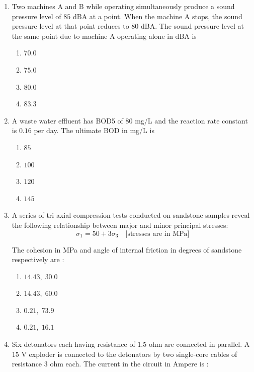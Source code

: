 \documentclass[journal,12pt,onecolumn]{IEEEtran}
\theoremstyle{remark}
\begin{document}
\begin{enumerate}
\hfill{}
\item Two machines A and B while operating simultaneously produce a sound pressure level of $85$ dBA at a point. When the machine A stops, the sound pressure level at that point reduces to $80$ dBA. The sound pressure level at the same point due to machine A operating alone in dBA is


\hfill{}
\begin{multicols}{4}
\begin{enumerate}
\item $70.0$
\item $75.0$
\item $80.0$
\item $83.3$
\end{enumerate}
\end{multicols}
\item A waste water effluent has BOD5 of $80$ mg/L and the reaction rate constant is $0.16$ per day. The ultimate BOD in mg/L is
\hfill{}
\begin{multicols}{4}
\begin{enumerate}
\item $85$
\item $100$
\item $120$
\item $145$
\end{enumerate}
\end{multicols}


\item A series of tri-axial compression tests conducted on sandstone samples reveal the following relationship between major and minor principal stresses:
\[
\sigma_{1} = 50 + 3\sigma_{3} \quad \text{[stresses are in MPa]}
\]

The cohesion in MPa and angle of internal friction in degrees of sandstone respectively are $\colon$


\hfill{}

\begin{multicols}{4}
\begin{enumerate}
\item $14.43, \; 30.0$
\item $14.43, \; 60.0$
\item $0.21, \; 73.9$
\item $0.21, \; 16.1$
\end{enumerate}
\end{multicols}

\item Six detonators each having resistance of $1.5$ ohm are connected in parallel. A $15$ V exploder is connected to the detonators by two single-core cables of resistance $3$ ohm each. The current in the circuit in Ampere is $\colon$


\end{enumerate}
\end{document}
